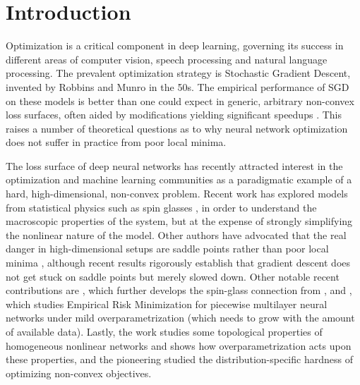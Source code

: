 \section{Introduction}
\label{sec:Intro}

%


Optimization is a critical component in deep learning, governing its success in different areas of computer vision, speech processing and natural language processing. The prevalent optimization strategy is Stochastic Gradient Descent, invented by Robbins and Munro in the 50s. The empirical performance of SGD on these models is better than one could expect in generic, arbitrary non-convex loss surfaces, often aided by modifications yielding significant speedups \cite{duchi2011adaptive, hinton2012lecture, ioffe2015batch, kingma2014adam}. This raises a number of theoretical questions as to why neural network optimization does not suffer in practice from poor local minima. 

The loss surface of deep neural networks has recently attracted interest 
in the optimization and machine learning communities as a paradigmatic example of 
a hard, high-dimensional, non-convex problem. 
Recent work has explored models from statistical physics such as spin glasses \cite{choromanska2015loss}, 
in order to understand the macroscopic properties of the system, but at the expense of strongly simplifying the nonlinear nature of the model. Other authors have advocated 
that the real danger in high-dimensional setups are saddle points 
rather than poor local minima \cite{dauphin2014identifying}, although 
recent results rigorously establish that gradient descent does not 
get stuck on saddle points \cite{lee2016gradient} but merely slowed down. 
Other notable recent contributions are \cite{followupmit}, which further develops the spin-glass 
connection from \cite{choromaska2015loss}, and \cite{choudry_columbia}, which studies Empirical Risk Minimization for piecewise multilayer neural networks under mild overparametrization (which needs to grow with the amount of available data). Lastly, the work \cite{shamir1} studies some topological 
properties of homogeneous nonlinear networks and shows how overparametrization acts upon these properties, and the pioneering \cite{shamir2} studied the distribution-specific hardness of optimizing non-convex objectives.

